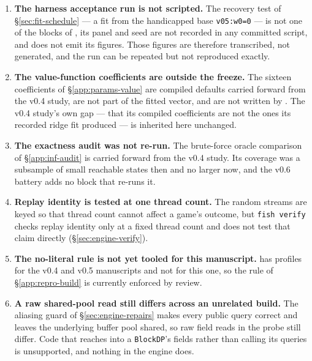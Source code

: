 \begin{enumerate}
  \item \textbf{The harness acceptance run is not scripted.} The recovery test of
        \S\ref{sec:fit-schedule} --- a fit from the handicapped base
        \texttt{v05:w0=0} --- is not one of the blocks of
        , its panel and seed are not recorded
        in any committed script, and  does
        not emit its figures. Those figures are therefore transcribed, not
        generated, and the run can be repeated but not reproduced exactly.
  \item \textbf{The value-function coefficients are outside the freeze.} The
        sixteen coefficients of \S\ref{app:params-value} are compiled defaults
        carried forward from the v0.4 study, are not part of the fitted vector,
        and are not written by . The v0.4
        study's own gap --- that its compiled coefficients are not the ones its
        recorded ridge fit produced --- is inherited here unchanged.
  \item \textbf{The exactness audit was not re-run.} The brute-force oracle
        comparison of \S\ref{app:inf-audit} is carried forward from the v0.4
        study. Its coverage was a subsample of small reachable states then and no
        larger now, and the v0.6 battery adds no block that re-runs it.
  \item \textbf{Replay identity is tested at one thread count.} The random
        streams are keyed so that thread count cannot affect a game's outcome,
        but \texttt{fish verify} checks replay identity only at a fixed thread
        count and does not test that claim directly
        (\S\ref{sec:engine-verify}).
  \item \textbf{The no-literal rule is not yet tooled for this manuscript.}
         has profiles for the v0.4 and v0.5 manuscripts
        and not for this one, so the rule of \S\ref{app:repro-build} is currently
        enforced by review.
  \item \textbf{A raw shared-pool read still differs across an unrelated build.}
        The aliasing guard of \S\ref{sec:engine-repairs} makes every public query
        correct and leaves the underlying buffer pool shared, so
        \vsixAliasRawMismatch{} raw field reads in the probe still differ. Code
        that reaches into a \texttt{BlockDP}'s fields rather than calling its
        queries is unsupported, and nothing in the engine does.
\end{enumerate}
